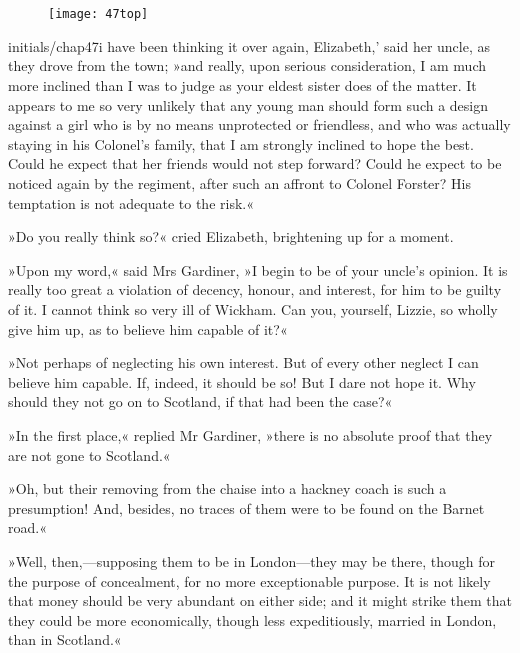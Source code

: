\chapter[Chapter \thechapter]{}
	
	\begin{figure}[t!]
\centering
\texttt{[image: 47top]}
\end{figure}

\lettrine[lines=6,image=true,ante=`,loversize=.1,findent=2pt]{initials/chap47i}{} have been thinking it over again, Elizabeth,' said her uncle, as they drove from the town; »and really, upon serious consideration, I am much more inclined than I was to judge as your eldest sister does of the matter. It appears to me so very unlikely that any young man should form such a design against a girl who is by no means unprotected or friendless, and who was actually staying in his Colonel's family, that I am strongly inclined to hope the best. Could he expect that her friends would not step forward? Could he expect to be noticed again by the regiment, after such an affront to Colonel Forster? His temptation is not adequate to the risk.«

»Do you really think so?« cried Elizabeth, brightening up for a moment.

»Upon my word,« said Mrs Gardiner, »I begin to be of your uncle's opinion. It is really too great a violation of decency, honour, and interest, for him to be guilty of it. I cannot think so very ill of Wickham. Can you, yourself, Lizzie, so wholly give him up, as to believe him capable of it?«

»Not perhaps of neglecting his own interest. But of every other neglect I can believe him capable. If, indeed, it should be so! But I dare not hope it. Why should they not go on to Scotland, if that had been the case?«

»In the first place,« replied Mr Gardiner, »there is no absolute proof that they are not gone to Scotland.«

»Oh, but their removing from the chaise into a hackney coach is such a presumption! And, besides, no traces of them were to be found on the Barnet road.«

»Well, then,—supposing them to be in London—they may be there, though for the purpose of concealment, for no more exceptionable purpose. It is not likely that money should be very abundant on either side; and it might strike them that they could be more economically, though less expeditiously, married in London, than in Scotland.«

